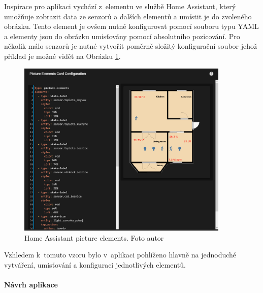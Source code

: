 Inspirace pro aplikaci vychází z~elementu ve službě Home Assistant, který umožňuje zobrazit data ze senzorů a dalších elementů a umístit je do zvoleného obrázku. Tento element je ovšem nutné konfigurovat pomocí souboru typu YAML a elementy jsou do obrázku umisťovány pomocí absolutního pozicování. Pro několik málo senzorů je nutné vytvořit poměrně složitý konfigurační soubor jehož příklad je možné vidět na Obrázku \ref{hassPicturesElement}.

\begin{figure}[H]
  \centering
  \includegraphics[width=0.9\textwidth]{obrazky-figures/dashboards/homeAssistantFloorPlan.PNG}
  \caption{Home Assistant picture elements. Foto autor}
  \label{hassPicturesElement}
\end{figure}

Vzhledem k~tomuto vzoru bylo v~aplikaci pohlíženo hlavně na jednoduché vytváření, umisťování a konfiguraci jednotlivých elementů. 

\newpage
\paragraph*{Návrh aplikace}\mbox{} \\ \label{application-design}

